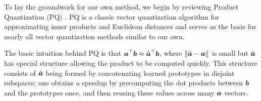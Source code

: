 


To lay the groundwork for our own method, we begin by reviewing Product Quantization (PQ) \cite{pq}. PQ is a classic vector quantization algorithm for approximating inner products and Euclidean distances and serves as the basis for nearly all vector quantization methods similar to our own. %


The basic intuition behind PQ is that $\bm{a}^\top \bm{b} \approx \hat{\bm{a}}^\top \bm{b}$, where $\lVert\hat{\bm{a}} - \bm{a}\rVert$ is small but $\hat{\bm{a}}$ has special structure allowing the product to be computed quickly. This structure consists of $\hat{\bm{a}}$ being formed by concatenating learned prototypes in disjoint subspaces; one obtains a speedup by precomputing the dot products between $\bm{b}$ and the prototypes once, and then reusing these values across many $\bm{a}$ vectors.

